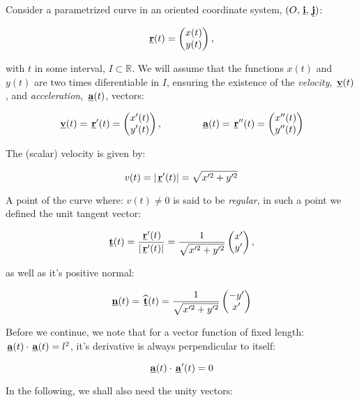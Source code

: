 Consider a parametrized curve in an oriented coordinate system, $(O,\hspace{0.05cm} \underline{\mathbf{i}},\hspace{0.05cm} \underline{\mathbf{j}})$:
 
 \[
  \hspace{0.05cm} \underline{\mathbf{r}}(t)=
  \begin{pmatrix}
   x(t)\\y(t)
  \end{pmatrix},
 \]

 with $t$ in some interval, $I \subset \mathbb{R}$. We will assume that the functions $x(t)$ and $y(t)$ are two times
 diferentiable in $I$, ensuring the existence of the \emph{velocity}, $\hspace{0.05cm} \underline{\mathbf{v}}(t)$, and \emph{acceleration}, $\hspace{0.05cm} \underline{\mathbf{a}}(t)$, vectors:
 
 \[
  \hspace{0.05cm} \underline{\mathbf{v}}(t)=
  \hspace{0.05cm} \underline{\mathbf{r}}'(t)=
  \begin{pmatrix}
   x'(t)\\y'(t)
  \end{pmatrix},
  \qquad \qquad
  \hspace{0.05cm} \underline{\mathbf{a}}(t)=
  \hspace{0.05cm} \underline{\mathbf{r}}''(t)=
  \begin{pmatrix}
   x''(t)\\y''(t)
  \end{pmatrix}
 \]

 
The (scalar) velocity is given by:

\[
 v(t)=|\hspace{0.05cm} \underline{\mathbf{r}}'(t)|=\sqrt{x'^2+y'^2}
\]

 A point of the curve where: $v(t) \neq 0$ is said to be \emph{regular}, in such a point we defined
 the unit tangent vector:
 
 \[
  \hspace{0.05cm} \underline{\mathbf{t}}(t)=
  \frac{ \hspace{0.05cm} \underline{\mathbf{r}}'(t) }{ |\hspace{0.05cm} \underline{\mathbf{r}}'(t)| }
  =
  \frac{1
  }
  { \sqrt{ x'^2+y'^2} }
  \begin{pmatrix}
   x'\\y'
  \end{pmatrix},
 \]
 
 as well as it's positive normal:
 
 \[
  \hspace{0.05cm} \underline{\mathbf{n}}(t)=
  \hspace{0.05cm} \underline{\mathbf{\widehat{t}}}(t)=
  \frac{
  1
  }
  { \sqrt{ x'^2+y'^2} }
  \begin{pmatrix}
   -y'\\x'
  \end{pmatrix}
  \]

  Before we continue, we note that for a vector function of fixed length: $\hspace{0.05cm} \underline{\mathbf{a}}(t) \cdot \hspace{0.05cm} \underline{\mathbf{a}}(t)=l^2$,
  it's derivative is always perpendicular to itself:
  
  \[
   \hspace{0.05cm} \underline{\mathbf{a}}(t) \cdot \hspace{0.05cm} \underline{\mathbf{a}}'(t)=0
  \]

  In the following, we shall also need the unity vectors:
  
